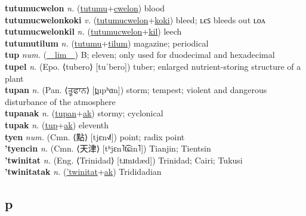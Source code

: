 \textbf{tutumucwelon} \textit{n.} (\hyperref[tutumu]{tutumu}+\hyperref[cwelon]{cwelon})
blood \label{tutumucwelon} \\
\textbf{tutumucwelonkoki} \textit{v.} (\hyperref[tutumucwelon]{tutumucwelon}+\hyperref[koki]{koki})
bleed; ʟєꜱ bleeds out ʟᴏᴧ \label{tutumucwelonkoki} \\
\textbf{tutumucwelonkil} \textit{n.} (\hyperref[tutumucwelon]{tutumucwelon}+\hyperref[kil]{kil})
leech \label{tutumucwelonkil} \\
\textbf{tutumutilum} \textit{n.} (\hyperref[tutumu]{tutumu}+\hyperref[tilum]{tilum})
magazine; periodical \label{tutumutilum} \\
\textbf{tup} \textit{num.} (\hyperref[lim]{~~lim~~})
B; eleven; only used for duodecimal and hexadecimal \label{tup} \\
\textbf{tupel} \textit{n.} (Epo. ⟨tubero⟩ [tuˈbero])
tuber; enlarged nutrient-storing structure of a plant \label{tupel} \\
\textbf{tupan} \textit{n.} (Pan. ⟨ਤੂਫਾਨ⟩ [t̪upʰɑn])
storm; tempest; violent and dangerous disturbance of the atmosphere \label{tupan} \\
\textbf{tupanak} \textit{n.} (\hyperref[tupan]{tupan}+\hyperref[ak]{ak})
stormy; cyclonical \label{tupanak} \\
\textbf{tupak} \textit{n.} (\hyperref[tup]{tup}+\hyperref[ak]{ak})
eleventh \label{tupak} \\
\textbf{tyen} \textit{num.} (Cmn. ⟨點⟩ [tjɛn˧˩˥])
point; radix point \label{tyen} \\
\textbf{'tyencin} \textit{n.} (Cmn. ⟨天津⟩ [tʰjɛn˥t͡ɕin˥])
Tianjin; Tientsin \label{'tyencin} \\
\textbf{'twinitat} \textit{n.} (Eng. ⟨Trinidad⟩ [tɹɪnɪdæd])
Trinidad; Cairi; Tukusi \label{'twinitat} \\
\textbf{'twinitatak} \textit{n.} (\hyperref['twinitat]{'twinitat}+\hyperref[ak]{ak})
Trididadian \label{'twinitatak} \\
\subsection{p}

